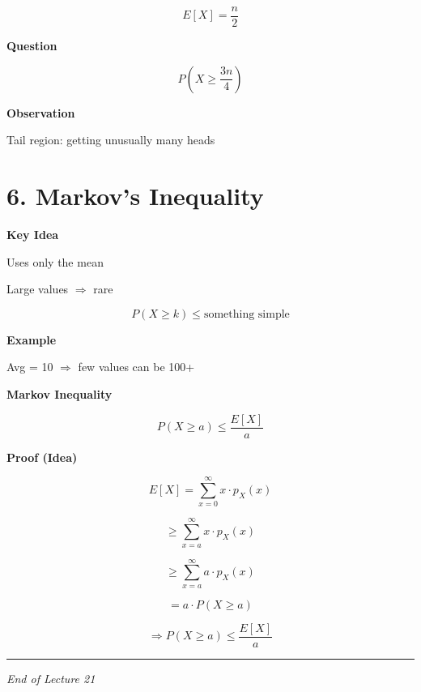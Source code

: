 \documentclass[11pt]{article}
\begin{document}
\[
E[X] = \frac{n}{2}
\]

\textbf{Question}

\[
P\left(X \geq \frac{3n}{4}\right)
\]

\textbf{Observation}

Tail region: getting unusually many heads

\section*{6. Markov’s Inequality}

\textbf{Key Idea}

Uses only the mean

Large values $\Rightarrow$ rare

\[
P(X \geq k) \leq \text{something simple}
\]

\textbf{Example}

Avg = 10 $\Rightarrow$ few values can be 100+

\textbf{Markov Inequality}

\[
P(X \geq a) \leq \frac{E[X]}{a}
\]

\textbf{Proof (Idea)}

\[
E[X] = \sum_{x=0}^{\infty} x \cdot p_X(x)
\]

\[
\geq \sum_{x=a}^{\infty} x \cdot p_X(x)
\]

\[
\geq \sum_{x=a}^{\infty} a \cdot p_X(x)
\]

\[
= a \cdot P(X \geq a)
\]

\[
\Rightarrow P(X \geq a) \leq \frac{E[X]}{a}
\]

\bigskip
\hrule
\vspace{0.2cm}
\begin{center}
    \small \textit{End of Lecture 21}
\end{center}
\end{document}
